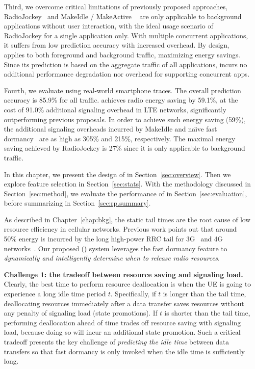 Third, we overcome critical limitations of previously proposed approaches, \ie RadioJockey~\cite{radiojockey} and MakeIdle / MakeActive ~\cite{makeidle} are only applicable to background applications without user interaction, with 
the ideal usage scenario of RadioJockey for a single application only. With multiple concurrent applications, it suffers from low prediction accuracy with increased overhead. By design, \NAME applies to both foreground and background traffic, maximizing energy savings. Since its prediction is based on the aggregate traffic of all applications, \NAME incurs no additional performance degradation nor overhead for supporting concurrent apps.

Fourth, we evaluate \NAME using real-world smartphone traces. The overall prediction accuracy is 85.9\% for all traffic. \NAME achieves radio energy saving by 59.1\%, at the cost of 91.0\% additional signaling overhead in LTE networks, significantly outperforming previous proposals. In order to achieve such energy saving (59\%), the additional signaling overheads incurred by MakeIdle and na\"{\i}ve fast dormancy~\cite{fast.dormancy.1, fast.dormancy.2} are as high as 305\% and 215\%, respectively. The maximal energy saving achieved by RadioJockey is 27\% since it is only applicable to background traffic.


In this chapter, we present the design of \NAME in Section~\ref{sec:overview}. Then we explore feature selection in Section~\ref{sec:stats}. With the methodology discussed in Section~\ref{sec:method}, we evaluate the performance of \NAME in Section~\ref{sec:evaluation}, before summarizing in Section~\ref{sec:rp.summary}.

\label{sec:overview}

As described in Chapter~\ref{chap:bkg}, the static tail times are the root cause of low resource efficiency in cellular networks. Previous work points out that around 50\% energy is incurred by the long high-power RRC tail for 3G~\cite{imc.3g} and 4G networks~\cite{huang_mobisys12}. Our proposed \NAMEFULL (\NAME) system leverages the fast dormancy feature to \emph{dynamically and intelligently determine when to release radio resources}.

\textbf{Challenge 1: the tradeoff between resource saving and signaling load.}
Clearly, the best time to perform resource deallocation is when the UE is going to experience a long idle time period $t$. Specifically, if $t$ is longer than the tail time, deallocating resources immediately after a data transfer saves resources without any penalty of signaling load (\ie state promotions). If $t$ is shorter than the tail time, performing deallocation ahead of time trades off resource saving with signaling load, because doing so will incur an additional state promotion. Such a critical tradeoff presents the key challenge of \emph{predicting the idle time} between data transfers so that fast dormancy is only invoked when the idle time is sufficiently long.


